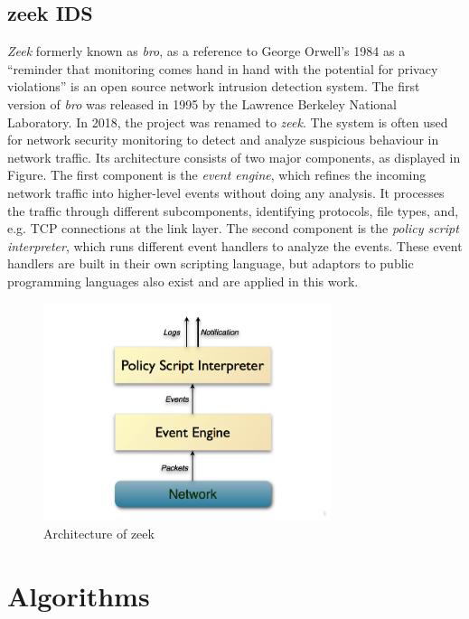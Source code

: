 \documentclass[
    fontsize=12pt,
    headings=small,
    parskip=half,           %
    bibliography=totoc,
    numbers=noenddot,       %
    open=any,               %
    ]{scrreprt}
\begin{document}
\subsection{zeek IDS}
\emph{Zeek} formerly known as \emph{bro}, as a reference to George Orwell's 1984 as a ``reminder that monitoring comes hand in hand with the potential for privacy violations'' \cite{zeek2023} is an open source network intrusion detection system. The first version of \emph{bro} was released in 1995 by the Lawrence Berkeley National Laboratory. In 2018, the project was renamed to \emph{zeek}. The system is often used for network security monitoring to detect and analyze suspicious behaviour in network traffic. Its architecture consists of two major components, as displayed in Figure. The first component is the \emph{event engine}, which refines the incoming network traffic into higher-level events without doing any analysis. It processes the traffic through different subcomponents, identifying protocols, file types, and, e.g. TCP connections at the link layer. The second component is the \emph{policy script interpreter}, which runs different event handlers to analyze the events. These event handlers are built in their own scripting language, but adaptors to public programming languages also exist and are applied in this work.

\begin{figure}[ht]
	\sffamily\footnotesize
	\includegraphics[width=0.75\textwidth]{pic/zeek_architecture.png}
	\unitlength=0.75mm
	\linethickness{0.4pt}
	\caption{Architecture of zeek \cite{zeek2023}}
	\label{fig:zeek_architecture}
\end{figure}

\section{Algorithms}
	
\end{document}
